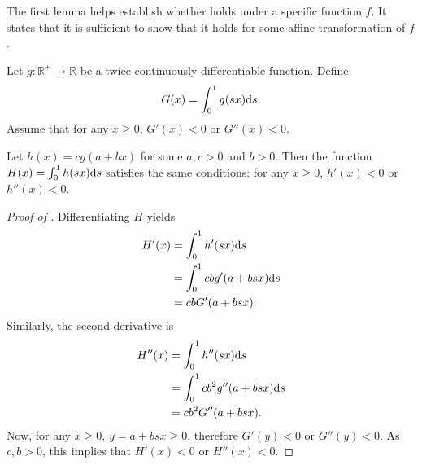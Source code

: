 The first lemma helps establish whether  holds under a specific function $f$.
It states that it is sufficient to show that it holds for some affine transformation of $f$.
\begin{lemma}
    \label{lem:single_crossing_affine_transformation}
    Let $g: \mathbb{R}^+ \to \mathbb{R}$ be a twice continuously differentiable function.
    Define
    \begin{align*}
        G(x) = \int_0^1 g(sx) \mathrm{d}s.
    \end{align*}
    Assume that for any $x \geq 0$, $G'(x) < 0$ or $G''(x) < 0$.

    Let $h(x) = c g(a + bx)$ for some $a, c > 0$ and $b > 0$.
    Then the function $H(x) = \int_0^1 h(sx) \mathrm{d}s$ satisfies the same conditions: for any $x \geq 0$, $h'(x) < 0$ or $h''(x) < 0$.
\end{lemma}
\begin{proof}[Proof of ]
    Differentiating $H$ yields
    \begin{align*}
        H'(x) &= \int_0^1 h'(sx) \mathrm{d}s \\
              &= \int_0^1 c b g'(a + bsx) \mathrm{d}s \\
              &= c b G'(a + bsx).
    \end{align*}
    Similarly, the second derivative is
    \begin{align*}
        H''(x) &= \int_0^1 h''(sx) \mathrm{d}s \\
               &= \int_0^1 c b^2 g''(a + bsx) \mathrm{d}s \\
               &= c b^2 G''(a + bsx).
    \end{align*}
    Now, for any $x \geq 0$, $y = a + bsx \geq 0$, therefore $G'(y) < 0$ or $G''(y) < 0$.
    As $c, b > 0$, this implies that $H'(x) < 0$ or $H''(x) < 0$.
\end{proof}

